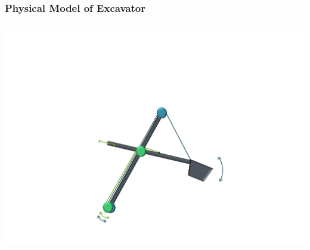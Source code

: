\begin{frame}
	\frametitle{Physical Model of Excavator}
	
	
	\begin{columns}
		\centering
		\includegraphics[trim=30cm 5cm 30cm 23cm, clip=true, width=\linewidth]{img/Excavator_Only}
	\end{columns}
	
\end{frame}

